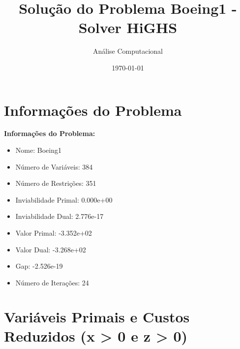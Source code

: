 \documentclass[12pt]{article}
\title{Solução do Problema Boeing1 - Solver HiGHS}
\author{Análise Computacional}
\date{\today}
\begin{document}
\maketitle

\section{Informações do Problema}

\textbf{Informações do Problema:}
\begin{itemize}
\item Nome: Boeing1
\item Número de Variáveis: 384
\item Número de Restrições: 351
\item Inviabilidade Primal: 0.000e+00
\item Inviabilidade Dual: 2.776e-17
\item Valor Primal: -3.352e+02
\item Valor Dual: -3.268e+02
\item Gap: -2.526e-19
\item Número de Iterações: 24
\end{itemize}


\section{Variáveis Primais e Custos Reduzidos (x > 0 e z > 0)}
\end{document}
